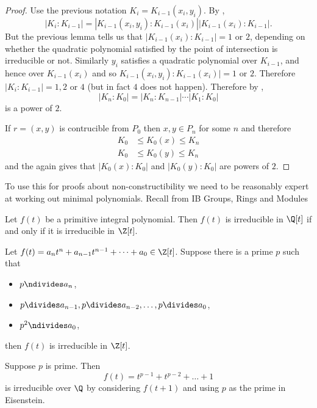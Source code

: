 \documentclass[a4paper]{article}
\begin{document}
\begin{proof}
  Use the previous notation \(K_i = K_{i - 1}(x_i, y_i)\). By ,
  \[
    |K_i : K_{i - 1}| = |K_{i - 1}(x_i, y_i) : K_{i - 1}(x_i)| |K_{i - 1}(x_i) : K_{i - 1}|.
  \]
  But the previous lemma tells us that \(|K_{i - 1}(x_i) : K_{i - 1}| = 1 \text{ or } 2\), depending on whether the quadratic polynomial satisfied by the point of intersection is irreducible or not. Similarly \(y_i\) satisfies a quadratic polynomial over \(K_{i - 1}\), and hence over \(K_{i - 1}(x_i)\) and so \(K_{i - 1}(x_i, y_i) : K_{i - 1}(x_i)| = 1 \text{ or } 2\). Therefore \(|K_i : K_{i - 1}| = 1, 2 \text{ or } 4\) (but in fact \(4\) does not happen). Therefore by ,
  \[
    |K_n : K_0| = |K_n : K_{n - 1}| \cdots |K_1 : K_0|
  \]
  is a power of \(2\).

  If \(r = (x, y)\) is contrucible from \(P_0\) then \(x, y \in P_n\) for some \(n\) and therefore
  \begin{align*}
    K_0 &\leq K_0(x) \leq K_n \\
    K_0 &\leq K_0(y) \leq K_n
  \end{align*}
  and the  again gives that \(|K_0(x) : K_0|\) and \(|K_0(y) : K_0|\) are powers of \(2\).
\end{proof}

To use this for proofs about non-constructibility we need to be reasonably expert at working out minimal polynomials. Recall from IB Groups, Rings and Modules

\begin{theorem}
  Let \(f(t)\) be a primitive integral polynomial. Then \(f(t)\) is irreducible in \(\Q[t]\) if and only if it is irreducible in \(\Z[t]\).
\end{theorem}

\begin{theorem}
  Let \(f(t) = a_nt^n + a_{n - 1}t^{n - 1} + \dots + a_0 \in \Z[t]\). Suppose there is a prime \(p\) such that
  \begin{itemize}
  \item \(p \ndivides a_n\),
  \item \(p \divides a_{n - 1}, p \divides a_{n - 2}, \dots, p \divides a_0\),
  \item \(p^2 \ndivides a_0\),
  \end{itemize}
  then \(f(t)\) is irreducible in \(\Z[t]\).
\end{theorem}

\begin{eg}
  Suppose \(p\) is prime. Then
  \[
    f(t) = t^{p - 1} + t^{p - 2} + \dots + 1
  \]
  is irreducible over \(\Q\) by considering \(f(t + 1)\) and using \(p\) as the prime in Eisenstein.
\end{eg}
\end{document}

